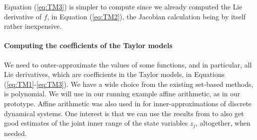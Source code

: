\documentclass{sig-alternate-05-2015}
\newtheorem{remark}{Remark}
\begin{document}
Equation (\ref{eq:TM3}) 
is simpler to compute since we already computed
the Lie derivative of $f$, in Equation (\ref{eq:TM2}), the Jacobian calculation being by
itself rather 
inexpensive. 

\paragraph{Computing the coefficients of the Taylor models}

We need to outer-approximate the values of some functions, and in particular, all Lie
derivatives, which are coefficients in the Taylor models, in Equations 
(\ref{eq:TM1}-\ref{eq:TM3}). We have a wide choice from the existing set-based
methods, %
is polynomial. 
We will use in our running example affine arithmetic\cite{com-sto-93-aa}, 
as in our prototype. %
Affine arithmetic was also used in \cite{hscc14} for inner-approximations of
discrete dynamical systems. One interest
is that we can use the results from \cite{rc13} to also get good estimates of the
joint inner range of the state variables $z_j$, altogether, when needed. 
\end{document}
